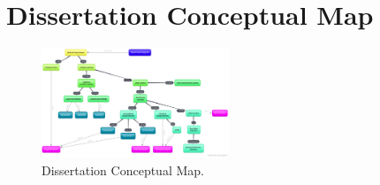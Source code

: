 \documentclass[
  twoside,
  11pt, a4paper,
  footinclude=true,
  headinclude=true,
  cleardoublepage=empty
]{scrbook}
\begin{document}
      \section{Dissertation Conceptual Map}
        \begin{figure}[h]
          \centering
          \includegraphics[angle=90,width=0.5\textwidth]{"./img/mind-map"}
          \caption[Dissertation Conceptual Map]{Dissertation Conceptual Map. }
          \label{background:summary:concepts}
        \end{figure}



  \endgroup
\end{document}
